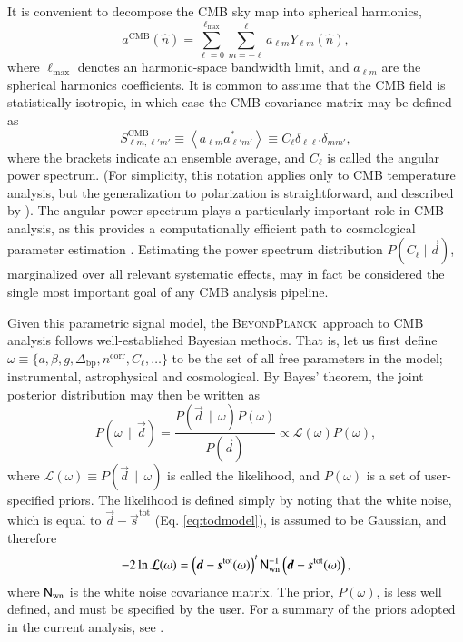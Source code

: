 \documentclass[twocolumn]{aa}
\renewcommand{\d}[0]{\vec{d}}
\newcommand{\s}[0]{\vec{s}}
\newcommand{\N}[0]{\tens{N}}
\newcommand{\BP}{\textsc{BeyondPlanck}}
\newcommand{\Dbp}[0]{\Delta_{\mathrm{bp}}}
\begin{document}
It is convenient to decompose the CMB sky map into spherical
harmonics,
\begin{equation}
a^{\mathrm{CMB}}(\hat{n}) =
\sum_{\ell=0}^{\ell_{\mathrm{max}}}\sum_{m=-\ell}^{\ell} a_{\ell m}
Y_{\ell m}(\hat{n}),
\end{equation}
where $\ell_{\mathrm{max}}$ denotes an harmonic-space bandwidth limit,
and $a_{\ell m}$ are the spherical harmonics coefficients. It is
common to assume that the CMB field is statistically isotropic, in
which case the CMB covariance matrix may be defined as
\begin{equation}
S_{\ell m, \ell' m'}^{\mathrm{CMB}} \equiv \left<a_{\ell m} a_{\ell'
  m'}^* \right> \equiv C_{\ell}\delta_{\ell \ell'} \delta_{mm'},
\label{eq:cmb_cov}
\end{equation}
where the brackets indicate an ensemble average, and $C_{\ell}$ is
called the angular power spectrum. (For simplicity, this notation
applies only to CMB temperature analysis, but the generalization to
polarization is straightforward, and described by
\citealp{zaldarriaga1997}). The angular power spectrum plays a
particularly important role in CMB analysis, as this provides a
computationally efficient path to cosmological parameter estimation
\citep[e.g.,][]{cosmomc}. Estimating the power spectrum distribution
$P(C_{\ell}\mid\d)$, marginalized over all relevant systematic effects,
may in fact be considered the single most important goal of any CMB
analysis pipeline.

Given this parametric signal model, the \BP\ approach to CMB analysis
follows well-established Bayesian methods. That is, let us first
define $\omega \equiv \{a, \beta, g, \Dbp, n^{\mathrm{corr}}, C_{\ell}, \ldots\}$ to be the set of all free parameters in the model;
instrumental, astrophysical and cosmological. By Bayes' theorem, the
joint posterior distribution may then be written as
\begin{equation}
  P(\omega\,\mid\,\d) = \frac{P(\d\,\mid\,\omega)P(\omega)}{P(\d)}
  \propto \mathcal{L}(\omega)P(\omega),
  \label{eq:joint_posterior_full}
\end{equation}
where $\mathcal{L}(\omega) \equiv P(\d\,\mid\,\omega)$ is called the
likelihood, and $P(\omega)$ is a set of user-specified priors. The
likelihood is defined simply by noting that the white noise, which is
equal to $\d-\s^{\mathrm{tot}}$ (Eq. \ref{eq:todmodel}), is assumed to be Gaussian, and 
therefore
\begin{equation}
-2\ln\mathcal{L}(\omega) = \left(\d-\s^{\mathrm{tot}}(\omega)\right)^t\N_{\mathrm{wn}}^{-1}\left(\d-\s^{\mathrm{tot}}(\omega)\right),
\end{equation}
where $\N_{\mathrm{wn}}$ is the white noise covariance matrix. The
prior, $P(\omega)$, is less well defined, and must be specified by the
user. For a summary of the priors adopted in the current analysis, see
\citet{bp01}.
\end{document}
